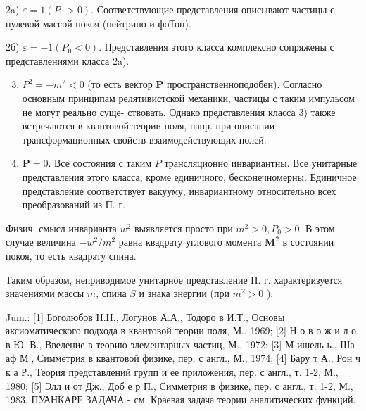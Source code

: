 \documentclass[10pt]{article}
\begin{document}
2a) $\varepsilon=1\left(P_{0}>0\right)$. Соответствующие представления описывают частицы с нулевой массой покоя (нейтрино и фоТон).



2б) $\varepsilon=-1\left(P_{0}<0\right)$. Представления этого класса комплексно сопряжены с представлениями класса 2a).



\begin{enumerate}

  \setcounter{enumi}{2}

  \item $P^{2}=-m^{2}<0$ (то есть вектор $\boldsymbol{P}$ пространственноподобен). Согласно основным принципам релятивистской механики, частицы с таким импульсом не могут реально суще- ствовать. Однако представления класса 3) также встречаются в квантовой теории поля, напр. при описании трансформационных свойств взаимодействующих полей.



  \item $\boldsymbol{P}=0$. Все состояния с таким $P$ трансляционно инвариантны. Все унитарные представления этого класса, кроме единичного, бесконечномерны. Единичное представление соответствует вакууму, инвариантному относительно всех преобразований из П. г.



\end{enumerate}



Физич. смысл инварианта $w^{2}$ выявляется просто при $m^{2}>0, P_{0}>0$. В этом случае величина $-w^{2} / m^{2}$ равна квадрату углового момента $\boldsymbol{M}^{2}$ в состоянии покоя, то есть квадрату спина.



Таким образом, неприводимое унитарное представление П. г. характеризуется значениями массы $m$, спина $S$ и знака энергии (при $m^{2}>0$ ).



Jum.: [1] Боголюбов Н.Н., Логунов А.А., Тодоро в И.Т., Основы аксиоматического подхода в квантовой теории поля, М., 1969; [2] Н о в о ж и л о в Ю. В., Введение в теорию элементарных частиц, М., 1972; [3] М ишель ь., Ша аф М., Симметрия в квантовой физике, пер. с англ., М., 1974; [4] Бару т А., Рон ч к а Р., Теория представлений групп и ее приложения, пер. с англ., т. 1-2, М., 1980; [5] Элл и от Дж., Доб е р П., Симметрия в физике, пер. с англ., т. 1-2, М., 1983. ПУАНКАРЕ ЗАДАЧА - см. Краевая задача теории аналитических функций.
\end{document}
